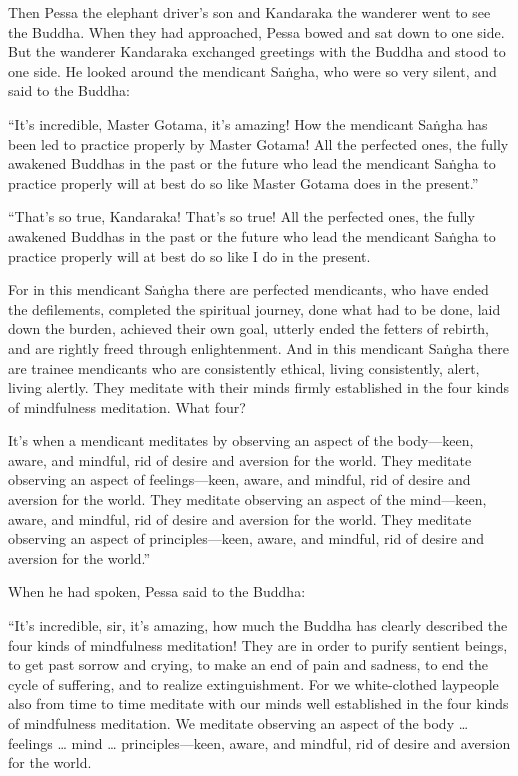 \documentclass[12pt,openany]{book}%
\begin{document}
Then Pessa the elephant driver’s son and Kandaraka the wanderer went to see the Buddha. When they had approached, Pessa bowed and sat down to one side. But the wanderer Kandaraka exchanged greetings with the Buddha and stood to one side. He looked around the mendicant \textsanskrit{Saṅgha}, who were so very silent, and said to the Buddha: 

“It’s incredible, Master Gotama, it’s amazing! How the mendicant \textsanskrit{Saṅgha} has been led to practice properly by Master Gotama! All the perfected ones, the fully awakened Buddhas in the past or the future who lead the mendicant \textsanskrit{Saṅgha} to practice properly will at best do so like Master Gotama does in the present.” 

“That’s so true, Kandaraka! That’s so true! All the perfected ones, the fully awakened Buddhas in the past or the future who lead the mendicant \textsanskrit{Saṅgha} to practice properly will at best do so like I do in the present. 

For in this mendicant \textsanskrit{Saṅgha} there are perfected mendicants, who have ended the defilements, completed the spiritual journey, done what had to be done, laid down the burden, achieved their own goal, utterly ended the fetters of rebirth, and are rightly freed through enlightenment. And in this mendicant \textsanskrit{Saṅgha} there are trainee mendicants who are consistently ethical, living consistently, alert, living alertly. They meditate with their minds firmly established in the four kinds of mindfulness meditation. What four? 

It’s when a mendicant meditates by observing an aspect of the body—keen, aware, and mindful, rid of desire and aversion for the world. They meditate observing an aspect of feelings—keen, aware, and mindful, rid of desire and aversion for the world. They meditate observing an aspect of the mind—keen, aware, and mindful, rid of desire and aversion for the world. They meditate observing an aspect of principles—keen, aware, and mindful, rid of desire and aversion for the world.” 

When he had spoken, Pessa said to the Buddha: 

“It’s incredible, sir, it’s amazing, how much the Buddha has clearly described the four kinds of mindfulness meditation! They are in order to purify sentient beings, to get past sorrow and crying, to make an end of pain and sadness, to end the cycle of suffering, and to realize extinguishment. For we white-clothed laypeople also from time to time meditate with our minds well established in the four kinds of mindfulness meditation. We meditate observing an aspect of the body … feelings … mind … principles—keen, aware, and mindful, rid of desire and aversion for the world. 
\end{document}
